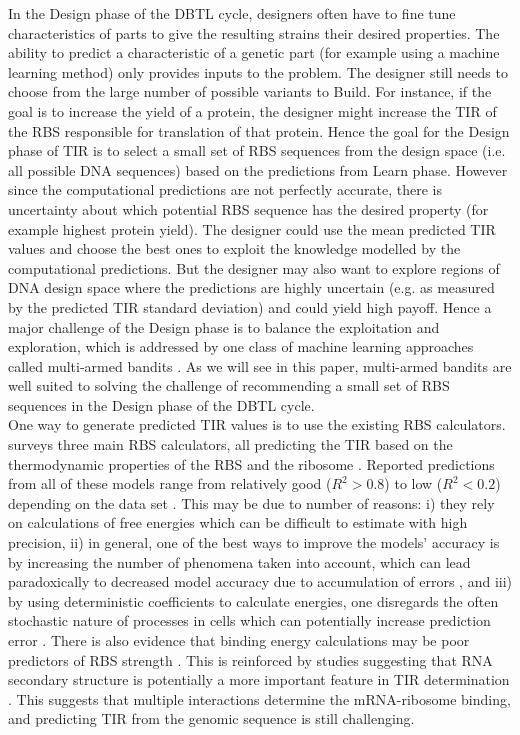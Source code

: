 \documentclass{article}
\begin{document}
In the Design phase of the DBTL cycle, designers often have to fine tune characteristics of parts to give the resulting strains their desired properties. The ability to predict a characteristic of a genetic part (for example using a machine
learning method) only provides inputs to the problem. The designer still needs to choose from the large number of
possible variants to Build.
For instance, if the goal is to increase the yield of a protein, the designer might increase the TIR of the RBS responsible for translation of that protein.
Hence the goal for the Design phase of TIR
is to select a small set of RBS sequences from the design space (i.e. all possible DNA sequences) based on the predictions from Learn phase.
However since the computational predictions are not perfectly accurate,
there is uncertainty about which potential RBS sequence has the desired
property (for example highest protein yield).
The designer could use the mean predicted TIR values and choose the best
ones to exploit the knowledge modelled by the computational predictions.
But the designer may also want to explore regions of DNA design space
where the predictions are highly uncertain (e.g. as measured by
the predicted TIR standard deviation) and could yield high payoff.
Hence a major challenge of the Design phase is to balance
the exploitation and exploration,
which is addressed by one class of machine learning approaches
called multi-armed bandits \cite{lattimore2020bandit}.
As we will see in this paper, multi-armed bandits are well suited
to solving the challenge of recommending a small set of RBS sequences
in the Design phase of the DBTL cycle.
\\

One way to generate predicted TIR values is to use the existing RBS calculators.
\textcite{Reeve2014} surveys three main RBS calculators, all predicting the TIR based on the thermodynamic properties of the RBS and the ribosome \cite{Seo2013,Na2010,Salis2009}.
Reported predictions from all of these models range from relatively good ($R^2 >0.8$) to low ($R^2 <0.2$) depending on the data set \cite{Reis2020}.
This may be due to number of reasons:
i) they rely on calculations of free energies which can be difficult to estimate with high precision,
ii) in general, one of the best ways to improve the models' accuracy is by increasing the number of phenomena taken into account, which can lead paradoxically to decreased model accuracy due to accumulation of errors \cite{EspahBorujeni2016}, and
iii) by using deterministic coefficients to calculate energies, one disregards the often stochastic nature of processes in cells which can potentially increase prediction error \cite{Goss1998}.
There is also evidence that binding energy calculations may be poor predictors of RBS strength \cite{Saito2020,Sherer1980}.
This is reinforced by studies suggesting that RNA secondary structure is potentially a more important feature in TIR determination \cite{DESMIT1994,EspahBorujeni2016}.
This suggests that multiple interactions determine the mRNA-ribosome binding, and predicting TIR from the genomic sequence is still challenging.\\
\end{document}
